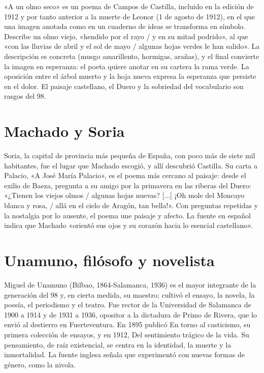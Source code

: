 \documentclass{book}
\begin{document}
«A un olmo seco» es un poema de Campos de Castilla, incluido en la edición de 1912 y por tanto anterior a la muerte de Leonor (1 de agosto de 1912), en el que una imagen anotada como en un cuaderno de ideas se transforma en símbolo. Describe un olmo viejo, «hendido por el rayo / y en su mitad podrido», al que «con las lluvias de abril y el sol de mayo / algunas hojas verdes le han salido». La descripción es concreta (musgo amarillento, hormigas, arañas), y el final convierte la imagen en esperanza: el poeta quiere anotar en su cartera la rama verde. La oposición entre el árbol muerto y la hoja nueva expresa la esperanza que persiste en el dolor. El paisaje castellano, el Duero y la sobriedad del vocabulario son rasgos del 98.


\section{Machado y Soria}

Soria, la capital de provincia más pequeña de España, con poco más de siete mil habitantes, fue el lugar que Machado escogió, y allí descubrió Castilla. Su carta a Palacio, «A José María Palacio», es el poema más cercano al paisaje: desde el exilio de Baeza, pregunta a su amigo por la primavera en las riberas del Duero: «¿Tienen los viejos olmos / algunas hojas nuevas? [...] ¡Oh mole del Moncayo blanca y rosa, / allá en el cielo de Aragón, tan bella!». Con preguntas repetidas y la nostalgia por lo ausente, el poema une paisaje y afecto. La fuente en español indica que Machado «orientó sus ojos y su corazón hacia lo esencial castellano».


\section{Unamuno, filósofo y novelista}

Miguel de Unamuno (Bilbao, 1864-Salamanca, 1936) es el mayor integrante de la generación del 98 y, en cierta medida, su maestro; cultivó el ensayo, la novela, la poesía, el periodismo y el teatro. Fue rector de la Universidad de Salamanca de 1900 a 1914 y de 1931 a 1936, opositor a la dictadura de Primo de Rivera, que lo envió al destierro en Fuerteventura. En 1895 publicó En torno al casticismo, su primera colección de ensayos, y en 1912, Del sentimiento trágico de la vida. Su pensamiento, de raíz existencial, se centra en la identidad, la muerte y la inmortalidad. La fuente inglesa señala que experimentó con nuevas formas de género, como la nivola.
\end{document}
